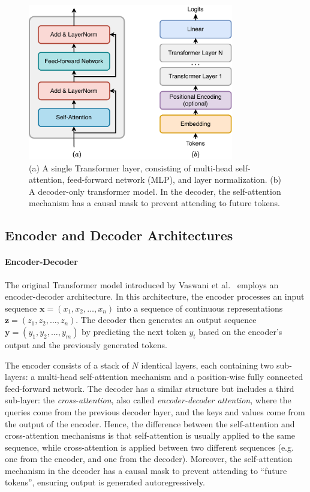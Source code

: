 \begin{figure}[h!]
    \centering
    \includegraphics[width=0.8\textwidth]{fig/transformer_layer.pdf}
    \caption{(a) A single Transformer layer, consisting of multi-head self-attention, feed-forward network (MLP), and layer normalization. (b) A decoder-only transformer model. In the decoder, the self-attention mechanism has a causal mask to prevent attending to future tokens.}
    \label{fig:transformer_layer}
\end{figure}


\subsection{Encoder and Decoder Architectures}\label{subsec:types_transformers}


\paragraph{Encoder-Decoder}

The original Transformer model introduced by Vaswani et al.~\cite{vaswani_attention_2017} employs an encoder-decoder architecture. In this architecture, the encoder processes an input sequence $\mathbf{x} = (x_1, x_2, \dots, x_n)$ into a sequence of continuous representations $\mathbf{z} = (z_1, z_2, \dots, z_n)$. The decoder then generates an output sequence $\mathbf{y} = (y_1, y_2, \dots, y_m)$ by predicting the next token $y_t$ based on the encoder's output and the previously generated tokens.

The encoder consists of a stack of $N$ identical layers, each containing two sub-layers: a multi-head self-attention mechanism and a position-wise fully connected feed-forward network. The decoder has a similar structure but includes a third sub-layer: the \emph{cross-attention}, also called \emph{encoder-decoder attention}, where the queries come from the previous decoder layer, and the keys and values come from the output of the encoder. Hence, the difference between the self-attention and cross-attention mechanisms is that self-attention is usually applied to the same sequence, while cross-attention is applied between two different sequences (e.g. one from the encoder, and one from the decoder). Moreover, the self-attention mechanism in the decoder has a causal mask to prevent attending to ``future tokens'', ensuring output is generated autoregressively.

